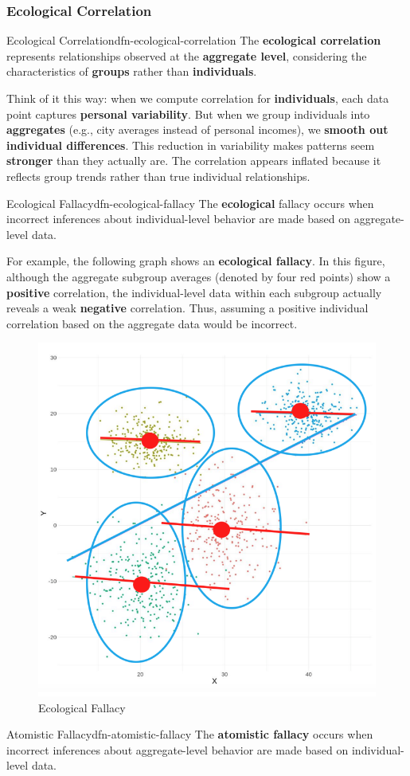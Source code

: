\documentclass[math,code]{amznotes}
\theoremstyle{remark}
\begin{document}
\subsubsection{Ecological Correlation}
\begin{dfnbox}{Ecological Correlation}{dfn-ecological-correlation}
    The {\color{red} \textbf{ecological correlation}} represents relationships observed at the \textbf{aggregate level}, considering the characteristics of \textbf{groups} rather than \textbf{individuals}.
\end{dfnbox}
Think of it this way: when we compute correlation for \textbf{individuals}, each data point captures \textbf{personal variability}. But when we group individuals into \textbf{aggregates} (e.g., city averages instead of personal incomes), we \textbf{smooth out individual differences}. This reduction in variability makes patterns seem \textbf{stronger} than they actually are. The correlation appears inflated because it reflects group trends rather than true individual relationships.
\begin{dfnbox}{Ecological Fallacy}{dfn-ecological-fallacy}
    The {\color{red} \textbf{ecological}} fallacy occurs when incorrect inferences about individual-level behavior are made based on aggregate-level data.
\end{dfnbox}
For example, the following graph shows an \textbf{ecological fallacy}. In this figure, although the aggregate subgroup averages (denoted by four red points) show a \textbf{positive} correlation, the individual-level data within each subgroup actually reveals a weak \textbf{negative} correlation. Thus, assuming a positive individual correlation based on the aggregate data would be incorrect.
\begin{figure}[H]
    \centering
    \includegraphics[width=0.3\linewidth]{images/chapter3-ecological-fallacy.png}
    \caption{Ecological Fallacy}
    \label{fig:chapter3-ecological-fallacy}
\end{figure}
\begin{dfnbox}{Atomistic Fallacy}{dfn-atomistic-fallacy}
    The {\color{red} \textbf{atomistic fallacy}} occurs when incorrect inferences about aggregate-level behavior are made based on individual-level data.
\end{dfnbox}
\end{document}
